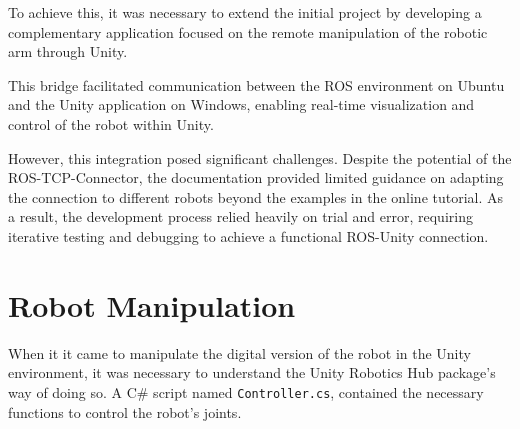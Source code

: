    To achieve this, it was necessary to extend the initial project by developing a complementary application focused on the remote manipulation 
    of the robotic arm through Unity. 

    This bridge facilitated communication between the ROS environment on Ubuntu and the Unity application on Windows, enabling real-time visualization 
    and control of the robot within Unity.

    However, this integration posed significant challenges. Despite the potential of the ROS-TCP-Connector, the documentation provided limited guidance 
    on adapting the connection to different robots beyond the examples in the online tutorial. As a result, the development process relied heavily on 
    trial and error, requiring iterative testing and debugging to achieve a functional ROS-Unity connection.

    

    \section{Robot Manipulation}
When it it came to manipulate the digital version of the robot in the Unity environment, it was necessary to understand the Unity Robotics Hub package's way of doing so. A C\# script named \texttt{Controller.cs}, contained the necessary functions to control the robot's joints.


